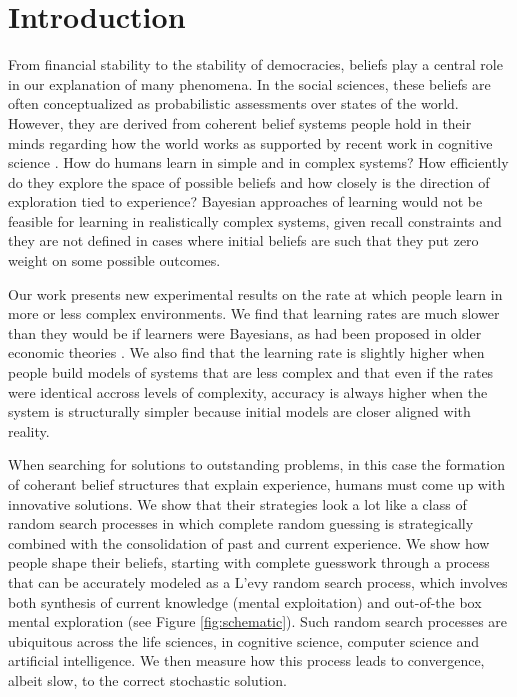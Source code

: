 \section{Introduction}
From financial stability to the stability of democracies, beliefs play a central role in our explanation of many phenomena. In the social sciences, these beliefs are often conceptualized as probabilistic assessments over states of the world.  However, they are derived from coherent belief systems people hold in their minds regarding how the world works as supported by recent work in cognitive science \cite{lombrozo2006structure, anderson1990cognitive}.  How do humans learn in simple and in complex systems?  How efficiently do they explore the space of possible beliefs and how closely is the direction of exploration tied to experience?  Bayesian approaches of learning would not be feasible for learning in realistically complex systems, given recall constraints and they are not defined in cases where initial beliefs are such that they put zero weight on some possible outcomes.  

Our work presents new experimental results on the rate at which people learn in more or less complex environments. We find that learning rates are much slower than they would be if learners were Bayesians, as had been proposed in older economic theories \cite{Boyer84, Prescott72, Rothschild74, McLennan84, Mirman84, Easley89, Kiefer89}. We also find that the learning rate is slightly higher when people build models of systems that are less complex and that even if the rates were identical accross levels of complexity, accuracy is always higher when the system is structurally simpler because initial models are closer aligned with reality.  

When searching for solutions to outstanding problems, in this case the formation of coherant belief structures that explain experience, humans must come up with innovative solutions.  We show that their strategies look a lot like a class of random search processes in which complete random guessing is strategically combined with the consolidation of past and current experience. We show how people shape their beliefs, starting with complete guesswork through a process that can be accurately modeled as a L'evy random search process, which involves both synthesis of current knowledge (mental exploitation) and out-of-the box mental exploration (see Figure \ref{fig:schematic}). Such random search processes are ubiquitous across the life sciences, in cognitive science, computer science  and artificial intelligence. We then measure how this process leads to convergence, albeit slow, to the correct stochastic solution.

